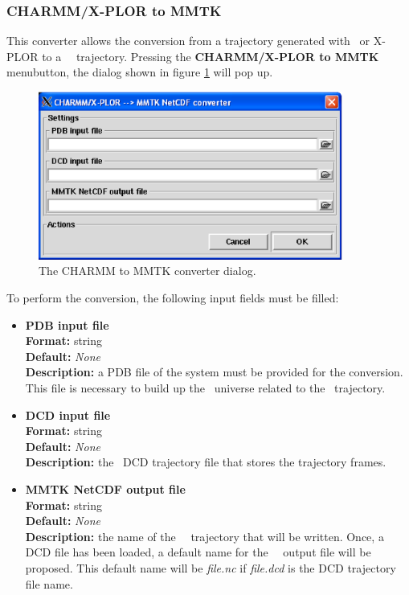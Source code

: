 \documentclass[a4paper,11pt]{report}
\begin{document}
\subsubsection{CHARMM/X-PLOR to MMTK}
\label{charmm_to_mmtk}
This converter allows the conversion from a trajectory generated with \CHARMM\ or X-PLOR \cite{CHARMM,X-PLOR} to a 
\MMTK\ \NetCDF\ trajectory. Pressing the \textbf{CHARMM/X-PLOR to MMTK} menubutton, the dialog shown in figure \ref{fig:charmm_converter} will pop up.
\begin{figure}[h!]
\begin{center}
\includegraphics[width=10cm]{Figures/charmm_converter.eps}
\end{center}
\caption[The CHARMM to MMTK converter dialog]{The CHARMM to MMTK converter dialog.}
\label{fig:charmm_converter}
\end{figure}   

To perform the conversion, the following input fields must be filled:
\begin{itemize}
\item \textbf{PDB input file}\\
\textbf{Format:} string\\
\textbf{Default:} \textit{None}\\
\textbf{Description:} a PDB file of the system must be provided for the conversion. This file is necessary to build up 
the \MMTK\ universe related to the \MMTK\ trajectory. 

\item \textbf{DCD input file}\\
\textbf{Format:} string\\
\textbf{Default:} \textit{None}\\
\textbf{Description:} the \CHARMM\ DCD trajectory file that stores the trajectory frames.

\item \textbf{MMTK NetCDF output file}\\
\textbf{Format:} string\\
\textbf{Default:} \textit{None}\\
\textbf{Description:} the name of the \MMTK\ \NetCDF\ trajectory that will be written. Once, a DCD file has been 
loaded, a default name for the \MMTK\ \NetCDF\ output file will be proposed. This default name will be 
\textit{file.nc} if \textit{file.dcd} is the DCD trajectory file name.
\end{itemize}
\end{document}
